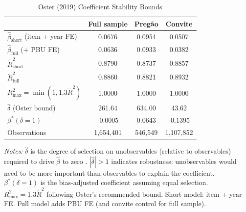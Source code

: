 \begin{table}[htbp]
\centering
\caption{Oster (2019) Coefficient Stability Bounds}
\label{tab:oster_delta}
\begin{threeparttable}
\small
\begin{tabular}{lccc}
\toprule
 & Full sample & Preg\~{a}o & Convite \\
\midrule
$\hat{\beta}_{\text{short}}$ (item + year FE) & 0.0676 & 0.0954 & 0.0507 \\
$\hat{\beta}_{\text{full}}$ (+ PBU FE) & 0.0636 & 0.0933 & 0.0382 \\
$\tilde{R}^2_{\text{short}}$ & 0.8790 & 0.8737 & 0.8857 \\
$\tilde{R}^2_{\text{full}}$ & 0.8860 & 0.8821 & 0.8932 \\
$R^2_{\max} = \min(1, 1.3 \tilde{R}^2)$ & 1.0000 & 1.0000 & 1.0000 \\
\midrule
$\hat{\delta}$ (Oster bound) & 261.64 & 634.00 & 43.62 \\
$\beta^*(\delta = 1)$ & -0.0005 & 0.0643 & -0.1395 \\
Observations & 1,654,401 & 546,549 & 1,107,852 \\
\bottomrule
\end{tabular}
\begin{tablenotes}
\small
\item \textit{Notes:} $\hat{\delta}$ is the degree of selection on
unobservables (relative to observables) required to drive $\hat{\beta}$ to zero
\citep{oster2019unobservable}. $|\hat{\delta}| > 1$ indicates robustness:
unobservables would need to be more important than observables to explain
the coefficient. $\beta^*(\delta = 1)$ is the bias-adjusted coefficient
assuming equal selection. $R^2_{\max} = 1.3 \tilde{R}^2$ following
Oster's recommended bound. Short model: item + year FE. Full model adds
PBU FE (and convite control for full sample).
\end{tablenotes}
\end{threeparttable}
\end{table}
